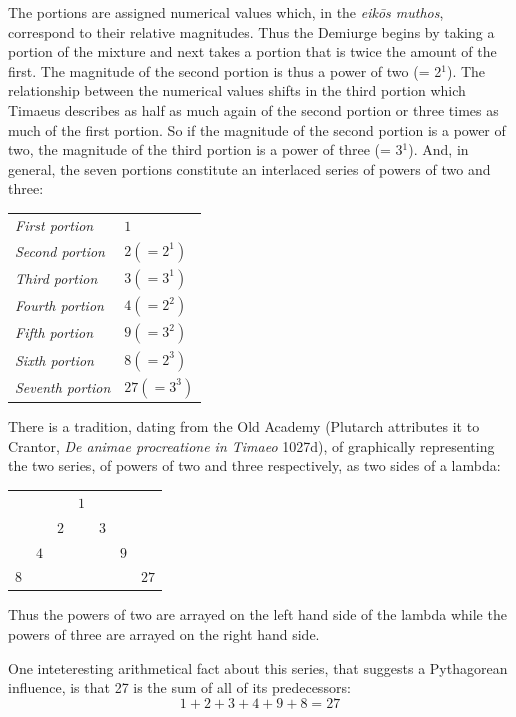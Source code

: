 The portions are assigned numerical values which, in the \emph{eikōs muthos}, correspond to their relative magnitudes. Thus the Demiurge begins by taking a portion of the mixture and next takes a portion that is twice the amount of the first. The magnitude of the second portion is thus a power of two (= 2\( ^1 \)). The relationship between the numerical values shifts in the third portion which Timaeus describes as half as much again of the second portion or three times as much of the first portion. So if the magnitude of the second portion is a power of two, the magnitude of the third portion is a power of three (= 3\( ^1 \)). And, in general, the seven portions constitute an interlaced series of powers of two and three:
\begin{center}
	\begin{tabular}{l l}
		\emph{First portion} & \( 1 \)\\
		\emph{Second portion} & \( 2 (= 2^1) \)\\
		\emph{Third portion} & \( 3 (= 3^1) \)\\
		\emph{Fourth portion} & \( 4 (= 2^2) \)\\
		\emph{Fifth portion} & \( 9 (= 3^2) \)\\
		\emph{Sixth portion} & \( 8 (= 2^3) \)\\
		\emph{Seventh portion} & \( 27 (= 3^3) \)\\
	\end{tabular}
\end{center}
There is a tradition, dating from the Old Academy (Plutarch attributes it to Crantor, \emph{De animae procreatione in Timaeo} 1027d), of graphically representing the two series, of powers of two and three respectively, as two sides of a lambda:
\begin{center}
	\begin{tabular}{c c c c c c c}
		 & & & \( 1 \) & & &\\
		 & & \( 2 \) & & \( 3 \) &\\
		 & \( 4 \) & & & & \( 9 \)\\
		 \( 8 \) & & & & & & \( 27 \)
	\end{tabular}
\end{center}
Thus the powers of two are arrayed on the left hand side of the lambda while the powers of three are arrayed on the right hand side. 

One inteteresting arithmetical fact about this series, that suggests a Pythagorean influence, is that 27 is the sum of all of its predecessors:
\[
	1 + 2 + 3 + 4 + 9 + 8 = 27
\]

